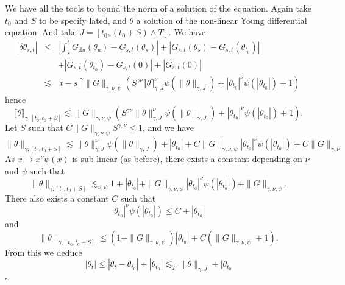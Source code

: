 \documentclass[a4paper,11pt]{article}
\newcommand{\mathd}{\mathrm{d}}
\newenvironment{proof}{{\sc Proof.}}{\hfill$\square$}
\begin{document}
\begin{proof}
  We have all the tools to bound the norm of a solution of the equation. Again
  take $t_{0}$ and $S$ to be specify lated, and $\theta$ a solution of the
  non-linear Young differential equation. And take $J= [ t_{0} , ( t_{0} +S )
  \wedge T ]$. We have
  \begin{eqnarray*}
    | \delta \theta_{s,t} | & \leqslant & \left\lvert \int_{s}^{t} G_{\mathd u} (
    \theta_{u} ) -G_{s,t} ( \theta_{s} ) \right\lvert + | G_{s,t} ( \theta_{s} )
    -G_{s,t} ( \theta_{t_{0}} ) | \\
    & & + | G_{s,t} ( \theta_{t_{0}} ) -G_{s,t} ( 0
    ) | + | G_{s,t} ( 0 ) |\\
    & \lesssim & | t-s |^{\gamma} \| G \|_{\gamma , \nu , \psi} ( S^{\gamma
    \nu} \llbracket \theta \rrbracket_{\gamma ,J}^{\nu} \psi ( \| \theta
    \|_{\gamma ,J} ) + | \theta_{t_{0}} |^{\nu} \psi ( | \theta_{t_{0}} | ) +1
    )
  \end{eqnarray*}
  hence
  \[ \llbracket \theta \rrbracket_{\gamma , [ t_{0} ,t_{0} +S ]} \lesssim \| G
     \|_{\gamma , \nu , \psi} ( S^{\gamma \nu} \| \theta \|_{\gamma ,J}^{\nu}
     \psi ( \| \theta \|_{\gamma ,J} ) + | \theta_{t_{0}} |^{\nu} \psi ( |
     \theta_{t_{0}} | ) +1 ) . \]
  Let $S$ such that $C \| G \|_{\gamma , \nu , \psi} S^{\gamma , \nu}
  \leqslant 1$, and we have
  \[ \| \theta \|_{\gamma , [ t_{0} ,t_{0} +S ]} \lesssim \| \theta \|_{\gamma
     ,J}^{\nu} \psi ( \| \theta \|_{\gamma ,J} ) + | \theta_{t_{0}} | +C \| G
     \|_{\gamma , \nu , \psi} | \theta_{t_{0}} |^{\nu} \psi ( | \theta_{t_{0}}
     | ) +C \| G \|_{\gamma , \nu} \]
  As $x \rightarrow x^{\nu} \psi ( x )$ is sub linear (as before), there
  exists a constant depending on $\nu$ and $\psi$ such that
  \[ \| \theta \|_{\gamma , [ t_{0} ,t_{0} +S ]} \lesssim_{\nu , \psi} 1+ |
     \theta_{t_{0}} | + \| G \|_{\gamma , \nu , \psi} | \theta_{t_{0}} |^{\nu}
     \psi ( | \theta_{t_{0}} | ) + \| G \|_{\gamma , \nu , \psi} . \]
  There also exists a constant $C$ such that
  \[ | \theta_{t_{0}} |^{\nu} \psi ( | \theta_{t_{0}} | ) \leqslant C+ |
     \theta_{t_{0}} | \]
  and
  \begin{equation}
    \| \theta \|_{\gamma , [ t_{0} ,t_{0} +S ]} \leqslant ( 1+ \| G \|_{\gamma
    , \nu , \psi} ) | \theta_{t_{0}} | +C ( \| G \|_{\gamma , \nu , \psi} +1 )
    . \label{eq:estimation-holder-norm-colutions}
  \end{equation}
  From this we deduce
  \[ | \theta_{t} | \leqslant | \theta_{t} - \theta_{t_{0}} | + |
     \theta_{t_{0}} | \lesssim_{T} \| \theta \|_{\gamma ,J} + | \theta_{t_{0}}
\]
\end{proof}
\end{document}
